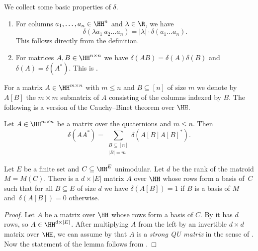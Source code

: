 \begin{rem}\label{rem:deltaHom}We collect some basic properties of $\delta$.
\begin{enumerate}
    \item For columns $a_1,\ldots,a_n\in\HH^n$ and $\lambda\in\R$, we have
    \begin{equation*}
      \delta(\lambda a_1\ a_2\ldots a_n)=|\lambda|\cdot\delta(a_1\ldots a_n).  
    \end{equation*}
    This follows directly from the definition.
    \item For matrices $A,B\in\HH^{n\times n}$ we have $\delta(AB)=\delta(A)\delta(B)$ and $\delta(A)=\delta(A^*)$. This is \cite[Lemma~5.2]{skewpartial}.
\end{enumerate}
\end{rem}

For a matrix $A\in\HH^{m\times n}$ with $m\leq n$ and $B\subseteq[n]$ of size $m$ we denote by $A[B]$ the $m\times m$ submatrix of $A$ consisting of the columns indexed by $B$.
The following is a version of the Cauchy--Binet theorem over $\HH$.

\begin{prop}\label{prop:CauchyBinetQuat}
    Let $A\in\HH^{m\times n}$ be a matrix over the quaternions and $m\leq n$. Then
    \begin{equation*}
        \delta(AA^*)=\sum_{\substack{B\subseteq[n]\\|B|=m}}\delta(A[B]A[B]^*).
    \end{equation*}
\end{prop}

\begin{lem}\label{lem:basisIffDelta1}
    Let $E$ be a finite set and $C\subseteq\HH^E$ unimodular. Let $d$ be the rank of the matroid $M=M(C)$.
    There is a $d\times |E|$ matrix $A$ over $\HH$ whose rows form a basis of~$C$ such that for all $B\subseteq E$ of size $d$ we have $\delta(A[B])=1$ if $B$ is a basis of $M$ and~$\delta(A[B])=0$ otherwise.
\end{lem}

\begin{proof}
 Let $A$ be a matrix over $\HH$ whose rows form a basis of $C$. By \cite[Lemma~3.14]{skewpartial} it has $d$ rows, so $A\in\HH^{d\times |E|}$. After multiplying $A$ from the left by an invertible $d\times d$ matrix over $\HH$, we can assume by \cite[Corollary~3.26]{skewpartial} that $A$ is a \emph{strong QU matrix} in the sense of \cite[Definition~3.23]{skewpartial}. Now the statement of the lemma follows from {\cite[Claim 5.4.1]{skewpartial}}.
\end{proof}

